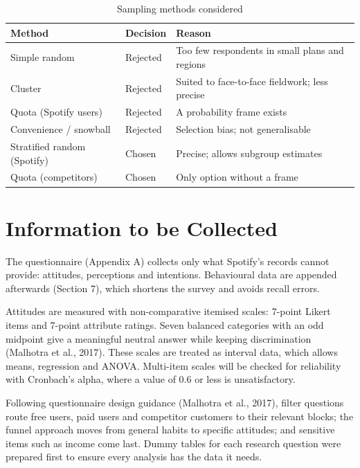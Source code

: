 \documentclass[11pt,a4paper]{article}
\begin{document}
{\small
\begin{longtable}{>{\raggedright\arraybackslash}p{0.28\dimexpr\textwidth-6\tabcolsep\relax}>{\raggedright\arraybackslash}p{0.15\dimexpr\textwidth-6\tabcolsep\relax}>{\raggedright\arraybackslash}p{0.49\dimexpr\textwidth-6\tabcolsep\relax}}
\caption{Sampling methods considered}\\
\toprule
\textbf{Method} & \textbf{Decision} & \textbf{Reason} \\
\midrule
\endhead
Simple random & Rejected & Too few respondents in small plans and regions \\
Cluster & Rejected & Suited to face-to-face fieldwork; less precise \\
Quota (Spotify users) & Rejected & A probability frame exists \\
Convenience / snowball & Rejected & Selection bias; not generalisable \\
Stratified random (Spotify) & Chosen & Precise; allows subgroup estimates \\
Quota (competitors) & Chosen & Only option without a frame \\
\bottomrule
\end{longtable}
}
\section{Information to be Collected}
The questionnaire (Appendix A) collects only what Spotify's records cannot provide: attitudes, perceptions and intentions. Behavioural data are appended afterwards (Section 7), which shortens the survey and avoids recall errors.

Attitudes are measured with non-comparative itemised scales: 7-point Likert items and 7-point attribute ratings. Seven balanced categories with an odd midpoint give a meaningful neutral answer while keeping discrimination (Malhotra et al., 2017). These scales are treated as interval data, which allows means, regression and ANOVA. Multi-item scales will be checked for reliability with Cronbach's alpha, where a value of 0.6 or less is unsatisfactory.

Following questionnaire design guidance (Malhotra et al., 2017), filter questions route free users, paid users and competitor customers to their relevant blocks; the funnel approach moves from general habits to specific attitudes; and sensitive items such as income come last. Dummy tables for each research question were prepared first to ensure every analysis has the data it needs.
\end{document}
